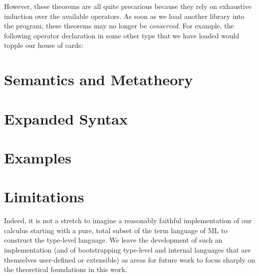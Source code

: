 \documentclass[9pt,preprint]{sigplanconf}
\begin{document}
However, these theorems are all quite precarious because they rely on exhaustive induction over the available operators. As soon as we load another library into the program, these theorems may no longer be \emph{conserved}. For example, the following operator declaration in some other type that we have loaded would topple our house of cards:

\section{Semantics and Metatheory}\label{theory}

\section{Expanded Syntax}\label{expanded-syntax}

\section{Examples}\label{examples}

\section{Limitations}\label{limitations}
Indeed, it is not a stretch to imagine a reasonably faithful implementation of our calculus starting with a pure, total subset of the term language of ML to construct the type-level language. We leave the development of such an implementation (and of bootstrapping type-level and internal languages that are themselves user-defined or extensible) as areas for future work to focus sharply on the theoretical foundations in this work.


\end{document}
